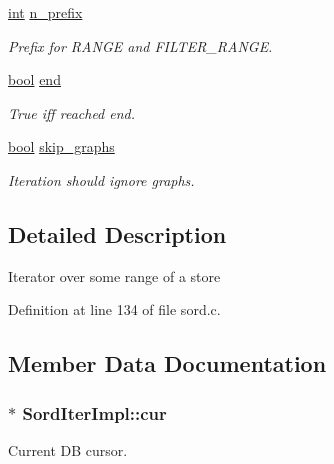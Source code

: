 \begin{DoxyCompactItemize}
\hyperlink{xmltok_8h_a5a0d4a5641ce434f1d23533f2b2e6653}{int} \hyperlink{struct_sord_iter_impl_ab4f3c352b905bb73293eb4750bf5c5c1}{n\+\_\+prefix}
\begin{DoxyCompactList}\small\item\em Prefix for R\+A\+N\+GE and F\+I\+L\+T\+E\+R\+\_\+\+R\+A\+N\+GE. \end{DoxyCompactList}\item 
\hyperlink{mac_2config_2i386_2lib-src_2libsoxr_2soxr-config_8h_abb452686968e48b67397da5f97445f5b}{bool} \hyperlink{struct_sord_iter_impl_a9f06edee03a201a00f7ef17a4beda272}{end}
\begin{DoxyCompactList}\small\item\em True iff reached end. \end{DoxyCompactList}\item 
\hyperlink{mac_2config_2i386_2lib-src_2libsoxr_2soxr-config_8h_abb452686968e48b67397da5f97445f5b}{bool} \hyperlink{struct_sord_iter_impl_ae3b907b1696be24090d34a7f4e478cbb}{skip\+\_\+graphs}
\begin{DoxyCompactList}\small\item\em Iteration should ignore graphs. \end{DoxyCompactList}\end{DoxyCompactItemize}


\subsection{Detailed Description}
Iterator over some range of a store 

Definition at line 134 of file sord.\+c.



\subsection{Member Data Documentation}
\subsubsection[{\texorpdfstring{cur}{cur}}]{$\ast$ Sord\+Iter\+Impl\+::cur}\hypertarget{struct_sord_iter_impl_a20e44d81d729fb567bd0660829261f94}{}\label{struct_sord_iter_impl_a20e44d81d729fb567bd0660829261f94}


Current DB cursor. 



